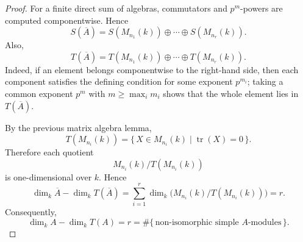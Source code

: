 \begin{proof}
    For a finite direct sum of algebras, commutators and \(p^m\)-powers are computed
    componentwise. Hence
    \[
        S(\overline{A})
        =
        S(M_{n_1}(k))\oplus\cdots\oplus S(M_{n_r}(k)).
    \]
    Also,
    \[
        T(\overline{A})
        =
        T(M_{n_1}(k))\oplus\cdots\oplus T(M_{n_r}(k)).
    \]
    Indeed, if an element belongs componentwise to the right-hand side, then each
    component satisfies the defining condition for some exponent \(p^{m_i}\); taking a
    common exponent \(p^m\) with \(m\geq \max_i m_i\) shows that the whole element
    lies in \(T(\overline{A})\).

    By the previous matrix algebra lemma,
    \[
        T(M_{n_i}(k))
        =
        \{\,X\in M_{n_i}(k)\mid \operatorname{tr}(X)=0\,\}.
    \]
    Therefore each quotient
    \[
        M_{n_i}(k)/T(M_{n_i}(k))
    \]
    is one-dimensional over \(k\). Hence
    \[
        \dim_k \overline{A}-\dim_k T(\overline{A})
        =
        \sum_{i=1}^r
        \dim_k\bigl(M_{n_i}(k)/T(M_{n_i}(k))\bigr)
        =
        r.
    \]
    Consequently,
    \[
        \dim_k A-\dim_k T(A)
        =
        r
        =
        \#\{\,\text{non-isomorphic simple }A\text{-modules}\,\}.
    \]
\end{proof}

